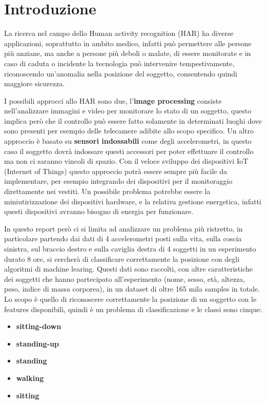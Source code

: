 \section{Introduzione}\label{sec:introduzione}
La ricerca nel campo dello Human activity recognition (HAR) ha diverse applicazioni, soprattutto in ambito medico, infatti può permettere alle persone più anziane, ma anche a persone più deboli o malate, di essere monitorate e in caso di caduta o incidente la tecnologia può intervenire tempestivamente, riconoscendo un'anomalia nella posizione del soggetto, consentendo quindi maggiore sicurezza.  

I possibili approcci allo HAR sono due, l'\textbf{image processing} consiste nell'analizzare immagini e video per monitorare lo stato di un soggetto, questo implica però che il controllo può essere fatto solamente in determinati luoghi dove sono presenti per esempio delle telecamere adibite allo scopo specifico. Un altro approccio è basato su \textbf{sensori indossabili} come degli accelerometri, in questo caso il soggetto dovrà indossare questi accessori per poter effettuare il controllo ma non ci saranno vincoli di spazio.  Con il veloce sviluppo dei dispositivi IoT (Internet of Things) questo approccio potrà essere sempre più facile da implementare, per esempio integrando dei dispositivi per il monitoraggio direttamente nei vestiti. Un possibile problema potrebbe essere la miniutirizzazione dei dispositivi hardware, e la relativa gestione energetica, infatti questi dispositivi avranno bisogno di energia per funzionare.

In questo report però ci si limita ad analizzare un problema più ristretto, in particolare partendo dai dati di 4 accelerometri posti sulla vita, sulla coscia sinistra, sul braccio destro e sulla caviglia destra di 4 soggetti in un esperimento durato 8 ore, si cercherà di classificare correttamente la posizione con degli algoritmi di machine learing. Questi dati sono raccolti, con altre caratteristiche dei soggetti che hanno partecipato all'esperimento (nome, sesso, età, altezza, peso, indice di massa corporea), in un dataset di oltre 165 mila samples in totale. Lo scopo è quello di riconoscere correttamente la posizione di un soggetto con le features disponibili, quindi è un problema di classificazione e le classi sono cinque:
\begin{itemize}
\item \textbf{sitting-down}
\item \textbf{standing-up}
\item \textbf{standing}
\item \textbf{walking}
\item \textbf{sitting}
\end{itemize}

